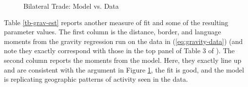 \documentclass[12pt,pdftex]{article}
\begin{document}
\begin{onehalfspacing}
\begin{figure}[!t]
\caption{Bilateral Trade: Model vs. Data}\label{fig:model-fit}
\end{figure}

Table \ref{tb-grav-est} reports another measure of fit and some of the resulting parameter values. The first column is the distance, border, and language moments from the gravity regression run on the data in (\ref{eq:gravity-data}) (and note they exactly correspond with those in the top panel of Table 3 of \citet{eaton2002technology}). The second column reports the moments from the model. Here, they exactly line up and are consistent with the argument in Figure \ref{fig:model-fit}, the fit is good, and the model is replicating geographic patterns of activity seen in the data.


\end{onehalfspacing}
\end{document}
